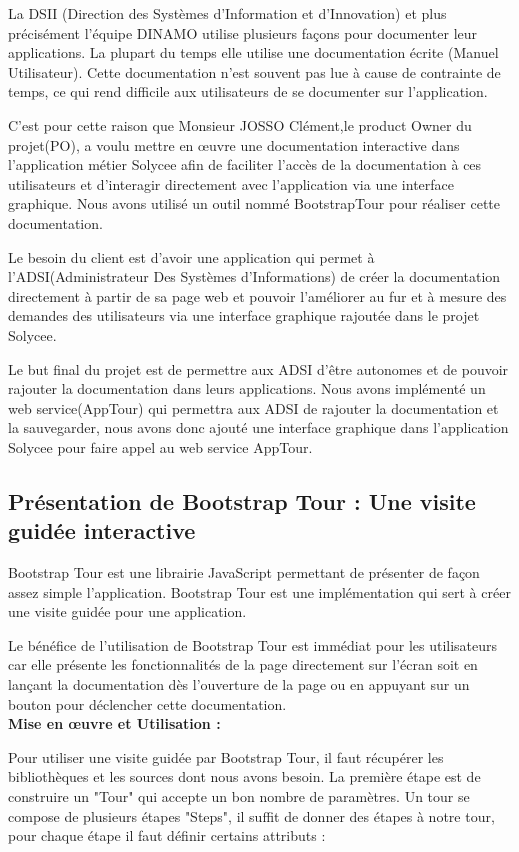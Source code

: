 \documentclass[12pt]{article}
\begin{document}
La DSII (Direction des Systèmes d'Information et d'Innovation) et plus précisément l'équipe DINAMO utilise plusieurs façons pour documenter leur applications. La plupart du temps elle utilise une documentation écrite (Manuel Utilisateur). Cette documentation n'est souvent pas lue à cause de contrainte de temps, ce qui rend difficile aux utilisateurs de se documenter sur l'application.


C'est pour cette raison que Monsieur JOSSO Clément,le product Owner du projet(PO), a voulu mettre en œuvre une documentation interactive dans l'application métier Solycee afin de faciliter l’accès de la documentation à ces utilisateurs et d'interagir directement avec l'application via une interface graphique. Nous avons utilisé un outil nommé BootstrapTour pour réaliser cette documentation. 

Le besoin du client est d'avoir une application qui permet à l'ADSI(Administrateur Des Systèmes d'Informations) de créer la documentation directement à partir de sa page web et pouvoir l'améliorer au fur et à mesure des demandes des utilisateurs via une interface graphique rajoutée dans le projet Solycee. 


Le but final du projet est de permettre aux ADSI d'être autonomes et de pouvoir rajouter la documentation dans leurs applications. Nous avons implémenté un web service(AppTour) qui permettra aux ADSI de rajouter la documentation et la sauvegarder, nous avons donc ajouté une interface graphique dans l'application Solycee pour faire appel au web service AppTour.
 
\subsection{Présentation de Bootstrap Tour : Une visite guidée interactive}
 
Bootstrap Tour est une librairie JavaScript permettant de présenter de façon assez simple l’application. Bootstrap Tour est une implémentation qui sert à créer une visite guidée pour une application.

Le bénéfice de l'utilisation de Bootstrap Tour est immédiat pour les utilisateurs car elle présente les fonctionnalités de la page directement sur l'écran soit en lançant la documentation  dès l'ouverture de la page ou en appuyant sur un bouton pour déclencher cette documentation.\\
\textbf{Mise en œuvre et  Utilisation :}

Pour utiliser une visite guidée par Bootstrap Tour, il faut récupérer les bibliothèques et les sources dont nous avons besoin. La première étape est de construire un "Tour" qui accepte un bon nombre de paramètres. Un tour se compose de plusieurs étapes "Steps", il suffit de donner des étapes à notre tour, pour chaque étape il faut définir certains attributs : 
\end{document}
